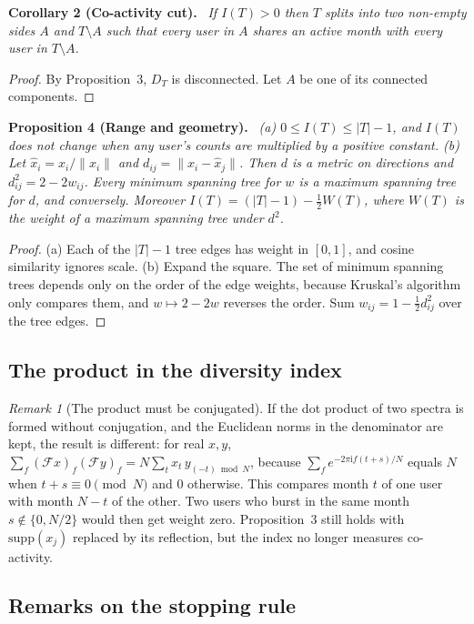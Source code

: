 \documentclass[11pt]{article}
\newcommand{\F}{\mathcal{F}}
\newcommand{\supp}{\mathrm{supp}}
\newcommand{\norm}[1]{\lVert #1 \rVert}
\newenvironment{result}[1]{\par\medskip\noindent\textbf{#1.}\ \itshape}{\par\smallskip}
\theoremstyle{remark}\newtheorem{remark}{Remark}\renewcommand{\theremark}{S\arabic{remark}}
\begin{document}
\begin{result}{Corollary 2 (Co-activity cut)}
If $I(T)>0$ then $T$ splits into two non-empty sides $A$ and $T\setminus A$ such that every user in $A$ shares an active month with every user in $T\setminus A$.
\end{result}
\begin{proof}
By Proposition~3, $D_T$ is disconnected. Let $A$ be one of its connected components.
\end{proof}

\begin{result}{Proposition 4 (Range and geometry)}
(a) $0\le I(T)\le|T|-1$, and $I(T)$ does not change when any user's counts are multiplied by a positive constant.
(b) Let $\hat x_i=x_i/\norm{x_i}$ and $d_{ij}=\norm{\hat x_i-\hat x_j}$. Then $d$ is a metric on directions and $d_{ij}^2=2-2w_{ij}$. Every minimum spanning tree for $w$ is a maximum spanning tree for $d$, and conversely. Moreover $I(T)=(|T|-1)-\frac12W(T)$, where $W(T)$ is the weight of a maximum spanning tree under $d^2$.
\end{result}
\begin{proof}
(a) Each of the $|T|-1$ tree edges has weight in $[0,1]$, and cosine similarity ignores scale. (b) Expand the square. The set of minimum spanning trees depends only on the order of the edge weights, because Kruskal's algorithm only compares them, and $w\mapsto2-2w$ reverses the order. Sum $w_{ij}=1-\frac12d_{ij}^2$ over the tree edges.
\end{proof}

\subsection*{The product in the diversity index}
\begin{remark}[The product must be conjugated]\label{rem:reflection}
If the dot product of two spectra is formed without conjugation, and the Euclidean norms in the denominator are kept, the result is different: for real $x,y$,
$\sum_f(\F x)_f(\F y)_f=N\sum_tx_t\,y_{(-t)\bmod N}$,
because $\sum_fe^{-2\pi\mathrm{i}f(t+s)/N}$ equals $N$ when $t+s\equiv0\pmod N$ and $0$ otherwise. This compares month $t$ of one user with month $N-t$ of the other. Two users who burst in the same month $s\notin\{0,N/2\}$ would then get weight zero. Proposition~3 still holds with $\supp(x_j)$ replaced by its reflection, but the index no longer measures co-activity.
\end{remark}

\subsection*{Remarks on the stopping rule}
\end{document}
